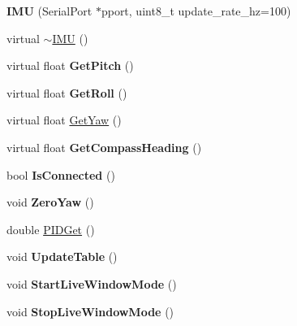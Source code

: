 \begin{DoxyCompactItemize}
\item 
\hypertarget{class_i_m_u_ae843cd598703cc3a38e8839aa3371c81}{}{\bfseries I\+M\+U} (Serial\+Port $\ast$pport, uint8\+\_\+t update\+\_\+rate\+\_\+hz=100)\label{class_i_m_u_ae843cd598703cc3a38e8839aa3371c81}

\item 
virtual \hyperlink{class_i_m_u_ad1f213d1e6aa08988ff683feab721559}{$\sim$\+I\+M\+U} ()
\item 
\hypertarget{class_i_m_u_ad5609b0448030d3eec8f59ad83b6291d}{}virtual float {\bfseries Get\+Pitch} ()\label{class_i_m_u_ad5609b0448030d3eec8f59ad83b6291d}

\item 
\hypertarget{class_i_m_u_adcd153b775a8d219d9256ca6390b2003}{}virtual float {\bfseries Get\+Roll} ()\label{class_i_m_u_adcd153b775a8d219d9256ca6390b2003}

\item 
virtual float \hyperlink{class_i_m_u_aecfad6302ad01869e1959b1d27fc4df1}{Get\+Yaw} ()
\item 
\hypertarget{class_i_m_u_af5503d6c0702237197c5308b250c6a39}{}virtual float {\bfseries Get\+Compass\+Heading} ()\label{class_i_m_u_af5503d6c0702237197c5308b250c6a39}

\item 
\hypertarget{class_i_m_u_a9d0d770cb38985e5c3ab35d1cd09b3e2}{}bool {\bfseries Is\+Connected} ()\label{class_i_m_u_a9d0d770cb38985e5c3ab35d1cd09b3e2}

\item 
\hypertarget{class_i_m_u_acb3fa9e821ed200dd7f39cd4ae94b7c1}{}void {\bfseries Zero\+Yaw} ()\label{class_i_m_u_acb3fa9e821ed200dd7f39cd4ae94b7c1}

\item 
double \hyperlink{class_i_m_u_a8484485e99ecdd6647059c307344f82d}{P\+I\+D\+Get} ()
\item 
\hypertarget{class_i_m_u_ab0dbda1a844ff67053b079b0dc9cb2d2}{}void {\bfseries Update\+Table} ()\label{class_i_m_u_ab0dbda1a844ff67053b079b0dc9cb2d2}

\item 
\hypertarget{class_i_m_u_aeb6fa87e7c59b22468102cb880948f8c}{}void {\bfseries Start\+Live\+Window\+Mode} ()\label{class_i_m_u_aeb6fa87e7c59b22468102cb880948f8c}

\item 
\hypertarget{class_i_m_u_ad84477436f7a01306204f74a917428fa}{}void {\bfseries Stop\+Live\+Window\+Mode} ()\label{class_i_m_u_ad84477436f7a01306204f74a917428fa}


\end{DoxyCompactItemize}
